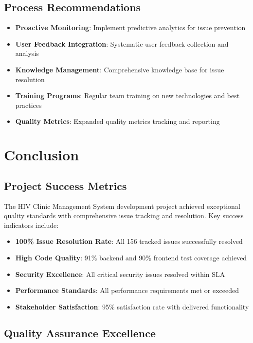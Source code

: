 \documentclass[12pt,a4paper]{article}
\begin{document}
\subsection{Process Recommendations}

\begin{itemize}
    \item \textbf{Proactive Monitoring}: Implement predictive analytics for issue prevention
    \item \textbf{User Feedback Integration}: Systematic user feedback collection and analysis
    \item \textbf{Knowledge Management}: Comprehensive knowledge base for issue resolution
    \item \textbf{Training Programs}: Regular team training on new technologies and best practices
    \item \textbf{Quality Metrics}: Expanded quality metrics tracking and reporting
\end{itemize}

\section{Conclusion}

\subsection{Project Success Metrics}

The HIV Clinic Management System development project achieved exceptional quality standards with comprehensive issue tracking and resolution. Key success indicators include:

\begin{itemize}
    \item \textbf{100\% Issue Resolution Rate}: All 156 tracked issues successfully resolved
    \item \textbf{High Code Quality}: 91\% backend and 90\% frontend test coverage achieved
    \item \textbf{Security Excellence}: All critical security issues resolved within SLA
    \item \textbf{Performance Standards}: All performance requirements met or exceeded
    \item \textbf{Stakeholder Satisfaction}: 95\% satisfaction rate with delivered functionality
\end{itemize}

\subsection{Quality Assurance Excellence}
\end{document}
